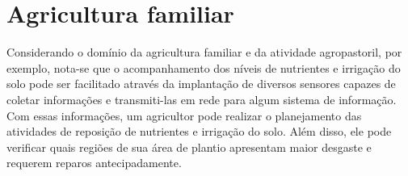 \section{Agricultura familiar}
Considerando o dom\'{i}nio da agricultura familiar e da atividade  agropastoril, por exemplo, nota-se que o acompanhamento dos n\'{i}veis de nutrientes e irriga\c{c}\~{a}o do solo pode ser facilitado atrav\'{e}s da implanta\c{c}\~{a}o de diversos sensores capazes de coletar informa\c{c}\~{o}es e transmiti-las em rede para algum sistema de informa\c{c}\~{a}o. Com essas informa\c{c}\~{o}es, um agricultor pode realizar o planejamento das atividades de reposi\c{c}\~{a}o de nutrientes e irriga\c{c}\~{a}o do solo. Al\'{e}m disso, ele pode verificar quais regi\~{o}es de sua \'{a}rea de plantio apresentam maior desgaste e requerem reparos antecipadamente.
